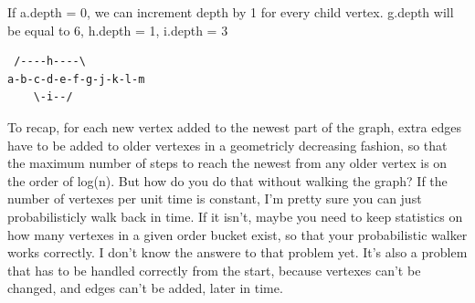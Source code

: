 \documentclass{article}
\begin{document}
If a.depth = 0, we can increment depth by 1 for every child vertex.
g.depth will be equal to 6, h.depth = 1, i.depth = 3 

\begin{verbatim}
 /----h----\
a-b-c-d-e-f-g-j-k-l-m
    \-i--/
\end{verbatim}

To recap, for each new vertex added to the
newest part of the graph, extra edges have to be added to older vertexes
in a geometricly decreasing fashion, so that the maximum number of steps
to reach the newest from any older vertex is on the order of log(n). But
how do you do that without walking the graph? If the number of vertexes
per unit time is constant, I'm pretty sure you can just probabilisticly
walk back in time. If it isn't, maybe you need to keep statistics on how
many vertexes in a given order bucket exist, so that your probabilistic
walker works correctly. I don't know the answere to that problem yet.
It's also a problem that has to be handled correctly from the start,
because vertexes can't be changed, and edges can't be added, later in
time.



\end{document}

